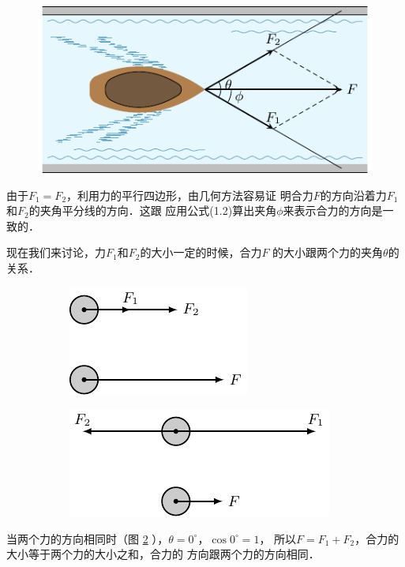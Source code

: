 \begin{figure} [htp]
\centering
\includegraphics{fig/A/1-25.pdf} 
\caption{} \label{fig_A_1-25} 
\end{figure} 

    由于$F_1=F_2$，利用力的平行四边形，由几何方法容易证
明合力$F$的方向沿着力$F_1$和$F_2$的夹角平分线的方向．这跟
应用公式(1.2)算出夹角$\phi$来表示合力的方向是一致的．

    现在我们来讨论，力$F_1$和$F_2$的大小一定的时候，合力$F$
的大小跟两个力的夹角$\theta$的关系．

\begin{figure} [htp]
\begin{subfigure} {0.46\linewidth} 
	\centering
	\includegraphics{fig/A/1-26a.pdf} 
	\caption{} \label{fig_A_1-26a} 
\end{subfigure} 
\hfil
\begin{subfigure} {0.46\linewidth} 
	\centering
	\includegraphics{fig/A/1-26b.pdf} 
	\caption{} \label{fig_A_1-26b} 
\end{subfigure} 
\caption{} \label{fig_A_1-26} 
\end{figure} 

    当两个力的方向相同时（图 \ref{fig_A_1-26a} ），$\theta =0^\circ$，$\cos 0^\circ=1$，
所以$F=F_1+F_2$，合力的大小等于两个力的大小之和，合力的
方向跟两个力的方向相同．

